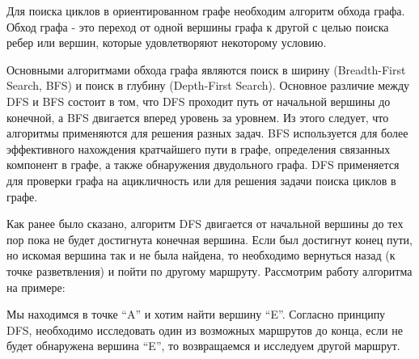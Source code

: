 \def\notedate{2022.04.25}
\def\currentauthor{Ершов В. (РК6-82Б)}

Для поиска циклов в ориентированном графе необходим алгоритм обхода графа. Обход графа - это переход от одной вершины графа к другой с целью поиска ребер или вершин, которые удовлетворяют некоторому условию.

Основными алгоритмами обхода графа являются поиск в ширину (Breadth-First Search, BFS) и поиск в глубину (Depth-First Search). Основное различие между DFS и BFS состоит в том, что DFS проходит путь от начальной вершины до конечной, а BFS двигается вперед уровень за уровнем. Из этого следует, что алгоритмы применяются для решения разных задач. BFS используется для более эффективного нахождения кратчайшего пути в графе, определения связанных компонент в графе, а также обнаружения двудольного графа. DFS применяется для проверки графа на ацикличность или для решения задачи поиска циклов в графе.

Как ранее было сказано, алгоритм DFS двигается от начальной вершины до тех пор пока не будет достигнута конечная вершина. Если был достигнут конец пути, но искомая вершина так и не была найдена, то необходимо вернуться назад (к точке разветвления) и пойти по другому маршруту. Рассмотрим работу алгоритма на примере:

\begin{figure}[H]
\end{figure}

Мы находимся в точке ``A'' и хотим найти вершину ``E''. Согласно принципу DFS, необходимо исследовать один из возможных маршрутов до конца, если не будет обнаружена вершина ``E'', то возвращаемся и исследуем другой маршрут.

